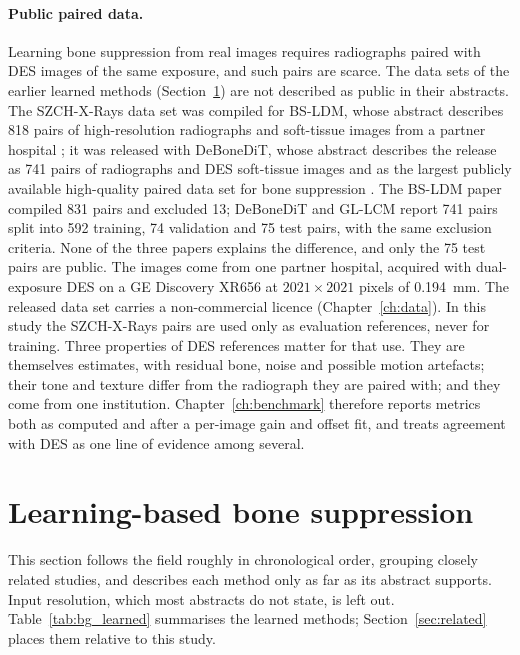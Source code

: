 \paragraph{Public paired data.} Learning bone suppression from real images requires radiographs paired with DES images of the same exposure, and
such pairs are scarce. The data sets of the earlier learned methods (Section~\ref{sec:bg_learned}) are not described as public in their
abstracts. The SZCH-X-Rays data set was compiled for BS-LDM, whose abstract describes 818 pairs of high-resolution radiographs and soft-tissue
images from a partner hospital \citep{sun2026bsldm}; it was released with DeBoneDiT, whose abstract describes the release as 741 pairs of
radiographs and DES soft-tissue images and as the largest publicly available high-quality paired data set for bone suppression \citep{sun2026debonedit}.
The BS-LDM paper compiled 831 pairs and excluded 13; DeBoneDiT and GL-LCM report 741 pairs split into 592 training, 74 validation and 75
test pairs, with the same exclusion criteria. None of the three papers explains the difference, and only the 75 test pairs are public. The
images come from one partner hospital, acquired with dual-exposure DES on a GE Discovery XR656 at $2021\times2021$ pixels of 0.194~mm.
The released data set carries a non-commercial licence (Chapter~\ref{ch:data}). In this study the SZCH-X-Rays pairs are used only as
evaluation references, never for training. Three properties of DES references matter for that use. They are themselves estimates, with residual
bone, noise and possible motion artefacts; their tone and texture differ from the radiograph they are paired with; and they come from one
institution. Chapter~\ref{ch:benchmark} therefore reports metrics both as computed and after a per-image gain and offset fit, and treats
agreement with DES as one line of evidence among several.

\section{Learning-based bone suppression}
\label{sec:bg_learned}
This section follows the field roughly in chronological order, grouping closely related studies, and describes each method only as far as its
abstract supports. Input resolution, which most abstracts do not state, is left out. Table~\ref{tab:bg_learned} summarises the learned methods; Section~\ref{sec:related} places them
relative to this study.

